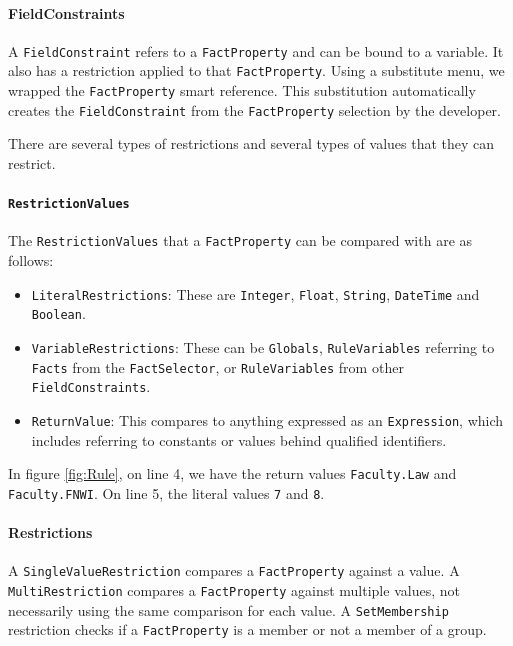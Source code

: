 \paragraph{FieldConstraints} A \texttt{FieldConstraint} refers to a \texttt{FactProperty} and can be bound to a variable.
It also has a restriction applied to that \texttt{FactProperty}.
Using a substitute menu, we wrapped the \texttt{FactProperty} smart reference.
This substitution automatically creates the \texttt{FieldConstraint} from the \texttt{FactProperty} selection by the developer.

There are several types of restrictions and several types of values that they can restrict.

\paragraph{\texttt{RestrictionValues}} The \texttt{RestrictionValues} that a \texttt{FactProperty} can be compared with are as follows:
\begin{itemize}    
    \setlength\itemsep{0em}
    \item \texttt{LiteralRestrictions}: These are \texttt{Integer}, \texttt{Float}, \texttt{String}, \texttt{DateTime} and \texttt{Boolean}.
    \item \texttt{VariableRestrictions}: These can be \texttt{Globals}, \texttt{RuleVariables} referring to \texttt{Facts} from the \texttt{FactSelector}, or \texttt{RuleVariables} from other \texttt{FieldConstraints}.
    \item \texttt{ReturnValue}: This compares to anything expressed as an \texttt{Expression}, which includes referring to constants or values behind qualified identifiers.
\end{itemize}

In figure \ref{fig:Rule}, on line 4, we have the return values \texttt{Faculty.Law} and \texttt{Faculty.FNWI}.
On line 5, the literal values \texttt{7} and \texttt{8}.

\paragraph{Restrictions} A \texttt{SingleValueRestriction} compares a \texttt{FactProperty} against a value.
A \texttt{MultiRestriction} compares a \texttt{FactProperty} against multiple values, not necessarily using the same comparison for each value.
A \texttt{SetMembership} restriction checks if a \texttt{FactProperty} is a member or not a member of a group.

